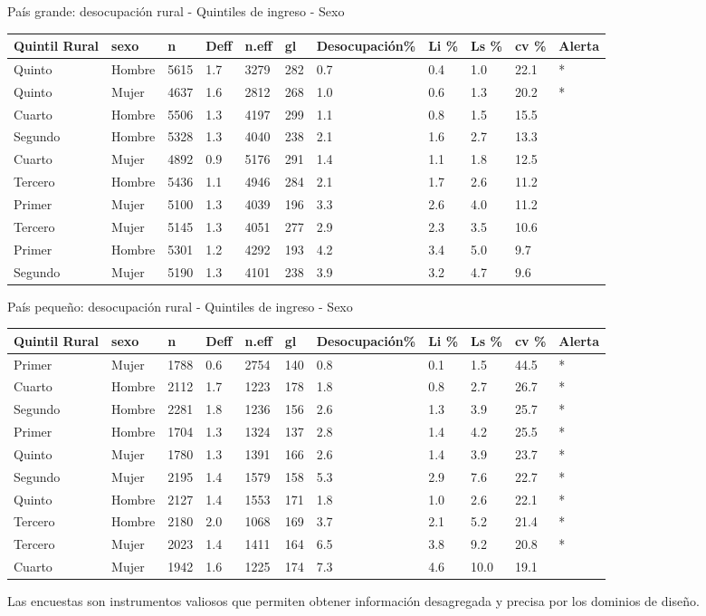 País grande: desocupación rural - Quintiles de ingreso - Sexo

\begin{longtable}[]{@{}lllllllllll@{}}
\toprule
Quintil Rural & sexo & n & Deff & n.eff & gl & Desocupación\% & Li \% & Ls \% & cv \% & Alerta\tabularnewline
\midrule
\endhead
Quinto & Hombre & 5615 & 1.7 & 3279 & 282 & 0.7 & 0.4 & 1.0 & 22.1 & *\tabularnewline
Quinto & Mujer & 4637 & 1.6 & 2812 & 268 & 1.0 & 0.6 & 1.3 & 20.2 & *\tabularnewline
Cuarto & Hombre & 5506 & 1.3 & 4197 & 299 & 1.1 & 0.8 & 1.5 & 15.5 &\tabularnewline
Segundo & Hombre & 5328 & 1.3 & 4040 & 238 & 2.1 & 1.6 & 2.7 & 13.3 &\tabularnewline
Cuarto & Mujer & 4892 & 0.9 & 5176 & 291 & 1.4 & 1.1 & 1.8 & 12.5 &\tabularnewline
Tercero & Hombre & 5436 & 1.1 & 4946 & 284 & 2.1 & 1.7 & 2.6 & 11.2 &\tabularnewline
Primer & Mujer & 5100 & 1.3 & 4039 & 196 & 3.3 & 2.6 & 4.0 & 11.2 &\tabularnewline
Tercero & Mujer & 5145 & 1.3 & 4051 & 277 & 2.9 & 2.3 & 3.5 & 10.6 &\tabularnewline
Primer & Hombre & 5301 & 1.2 & 4292 & 193 & 4.2 & 3.4 & 5.0 & 9.7 &\tabularnewline
Segundo & Mujer & 5190 & 1.3 & 4101 & 238 & 3.9 & 3.2 & 4.7 & 9.6 &\tabularnewline
\bottomrule
\end{longtable}

País pequeño: desocupación rural - Quintiles de ingreso - Sexo

\begin{longtable}[]{@{}lllllllllll@{}}
\toprule
Quintil Rural & sexo & n & Deff & n.eff & gl & Desocupación\% & Li \% & Ls \% & cv \% & Alerta\tabularnewline
\midrule
\endhead
Primer & Mujer & 1788 & 0.6 & 2754 & 140 & 0.8 & 0.1 & 1.5 & 44.5 & *\tabularnewline
Cuarto & Hombre & 2112 & 1.7 & 1223 & 178 & 1.8 & 0.8 & 2.7 & 26.7 & *\tabularnewline
Segundo & Hombre & 2281 & 1.8 & 1236 & 156 & 2.6 & 1.3 & 3.9 & 25.7 & *\tabularnewline
Primer & Hombre & 1704 & 1.3 & 1324 & 137 & 2.8 & 1.4 & 4.2 & 25.5 & *\tabularnewline
Quinto & Mujer & 1780 & 1.3 & 1391 & 166 & 2.6 & 1.4 & 3.9 & 23.7 & *\tabularnewline
Segundo & Mujer & 2195 & 1.4 & 1579 & 158 & 5.3 & 2.9 & 7.6 & 22.7 & *\tabularnewline
Quinto & Hombre & 2127 & 1.4 & 1553 & 171 & 1.8 & 1.0 & 2.6 & 22.1 & *\tabularnewline
Tercero & Hombre & 2180 & 2.0 & 1068 & 169 & 3.7 & 2.1 & 5.2 & 21.4 & *\tabularnewline
Tercero & Mujer & 2023 & 1.4 & 1411 & 164 & 6.5 & 3.8 & 9.2 & 20.8 & *\tabularnewline
Cuarto & Mujer & 1942 & 1.6 & 1225 & 174 & 7.3 & 4.6 & 10.0 & 19.1 &\tabularnewline
\bottomrule
\end{longtable}

Las encuestas son instrumentos valiosos que permiten obtener información desagregada y precisa por los dominios de diseño.

